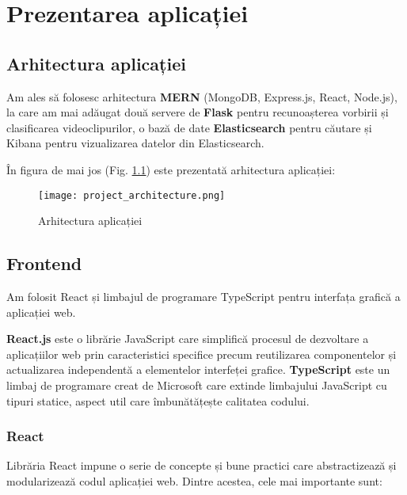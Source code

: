\chapter{Prezentarea aplicației}

\section{Arhitectura aplicației}
Am ales să folosesc arhitectura \textbf{MERN} (MongoDB, Express.js, React, Node.js), la care am mai adăugat
două servere de \textbf{Flask} pentru recunoașterea vorbirii și clasificarea videoclipurilor, o bază de
date \textbf{Elasticsearch} pentru căutare și Kibana pentru vizualizarea datelor din Elasticsearch.
\par
În figura de mai jos (Fig. \ref{fig:project-architecture}) este prezentată arhitectura aplicației:

\begin{figure}[h]
    \centering
    \texttt{[image: project\_architecture.png]}
    \caption{Arhitectura aplicației}
    \label{fig:project-architecture}
\end{figure}


\section{Frontend}
Am folosit React și limbajul de programare TypeScript pentru interfața grafică a aplicației web. 
\par
\textbf{React.js} este o librărie JavaScript care simplifică procesul de dezvoltare a aplicațiilor web prin 
caracteristici specifice precum reutilizarea componentelor și actualizarea independentă a
elementelor interfeței grafice. \textbf{TypeScript} este un limbaj de programare creat de Microsoft care
extinde limbajului JavaScript cu tipuri statice, aspect util care îmbunătățește calitatea codului.

\subsection{React}
Librăria React impune o serie de concepte și bune practici care abstractizează și modularizează
codul aplicației web. Dintre acestea, cele mai importante sunt:

